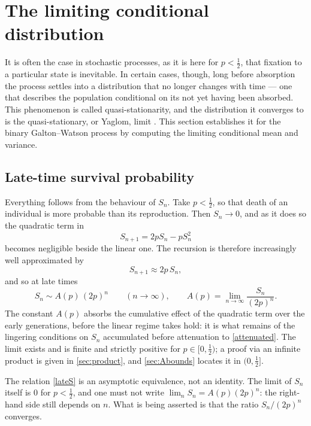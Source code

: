 \section{The limiting conditional distribution}
\label{sec:qsd}

It is often the case in stochastic processes, as it is here for $p<\tfrac12$, that
fixation to a particular state is inevitable. In certain cases, though, long before
absorption the process settles into a distribution that no longer changes with time ---
one that describes the population conditional on its not yet having been absorbed. This
phenomenon is called quasi-stationarity, and the distribution it converges to is the
quasi-stationary, or Yaglom, limit \cite{Yaglom1947,Athreya1972}. This section
establishes it for the binary Galton--Watson process by computing the limiting
conditional mean and variance.

\subsection{Late-time survival probability}
\label{sec:lateS}

Everything follows from the behaviour of $S_n$. Take $p<\tfrac12$, so that death of an
individual is more probable than its reproduction. Then $S_n\to0$, and as it does so
the quadratic term in
\begin{equation*}
S_{n+1} = 2pS_n - pS_n^2
\end{equation*}
becomes negligible beside the linear one. The recursion is therefore increasingly well
approximated by
\begin{equation}
\label{attenuated}
S_{n+1} \approx 2p\,S_n,
\end{equation}
and so at late times
\begin{equation}
\label{lateS}
S_n \sim A(p)\,(2p)^n \qquad (n\to\infty),
\qquad
A(p) = \lim_{n\to\infty}\frac{S_n}{(2p)^n}.
\end{equation}
The constant $A(p)$ absorbs the cumulative effect of the quadratic term over the early
generations, before the linear regime takes hold: it is what remains of the lingering
conditions on $S_n$ accumulated before attenuation to \cref{attenuated}. The limit exists
and is finite and strictly positive for $p\in[0,\tfrac12)$; a proof via an infinite
product is given in \cref{sec:product}, and \cref{sec:Abounds} locates it in
$(0,\tfrac12]$.

\begin{remark}
The relation \cref{lateS} is an asymptotic equivalence, not an identity. The limit of
$S_n$ itself is $0$ for $p<\tfrac12$, and one must not write
$\lim_n S_n = A(p)(2p)^n$: the right-hand side still depends on $n$. What is being
asserted is that the ratio $S_n/(2p)^n$ converges.
\end{remark}


